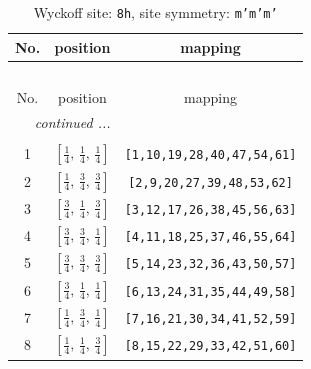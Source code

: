 \documentclass[fleqn,8pt]{jsarticle}
\begin{document}
\begin{longtable}{ccc}
\caption{Wyckoff site: {\tt 8h}, site symmetry: {\tt m'm'm'}}
 \\
 \hline \hline
No. & position & mapping \\ \hline \endfirsthead

\multicolumn{2}{l}{\tablename\ \thetable{}} \\
 \hline \hline
No. & position & mapping \\ \hline \endhead

 \hline \hline
\multicolumn{2}{r}{\footnotesize\it continued ...} \\ \endfoot

 \hline \hline
\multicolumn{2}{r}{} \\ \endlastfoot

1 & $\left[ \frac{1}{4},\, \frac{1}{4},\, \frac{1}{4} \right]$ & {\tt [1,10,19,28,40,47,54,61]} \\ \hline
2 & $\left[ \frac{1}{4},\, \frac{3}{4},\, \frac{3}{4} \right]$ & {\tt [2,9,20,27,39,48,53,62]} \\ \hline
3 & $\left[ \frac{3}{4},\, \frac{1}{4},\, \frac{3}{4} \right]$ & {\tt [3,12,17,26,38,45,56,63]} \\ \hline
4 & $\left[ \frac{3}{4},\, \frac{3}{4},\, \frac{1}{4} \right]$ & {\tt [4,11,18,25,37,46,55,64]} \\ \hline
5 & $\left[ \frac{3}{4},\, \frac{3}{4},\, \frac{3}{4} \right]$ & {\tt [5,14,23,32,36,43,50,57]} \\ \hline
6 & $\left[ \frac{3}{4},\, \frac{1}{4},\, \frac{1}{4} \right]$ & {\tt [6,13,24,31,35,44,49,58]} \\ \hline
7 & $\left[ \frac{1}{4},\, \frac{3}{4},\, \frac{1}{4} \right]$ & {\tt [7,16,21,30,34,41,52,59]} \\ \hline
8 & $\left[ \frac{1}{4},\, \frac{1}{4},\, \frac{3}{4} \right]$ & {\tt [8,15,22,29,33,42,51,60]} \\
\end{longtable}
\renewcommand{\arraystretch}{1.2}
\end{document}
